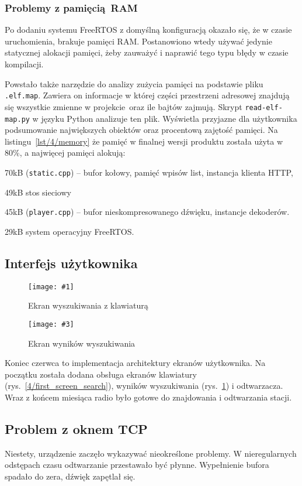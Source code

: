 \documentclass[polish]{aghengthesis}
\let\tempone\itemize
\let\temptwo\enditemize
\renewenvironment{itemize}{\tempone\setlength{\itemsep}{0cm}}{\temptwo}
\newcommand{\imgintss}[5]{
	\begin{figure}[{#5}]
		\centering
		\begin{minipage}{.45\textwidth}
			\centering
			\texttt{[image: \#1]}
			\caption{#2}
			\label{#1}
		\end{minipage}%
		\hfill
		\begin{minipage}{.45\textwidth}
			\centering
			\texttt{[image: \#3]}
			\caption{#4}
			\label{#3}
		\end{minipage}
	\end{figure}
}
\newcommand{\imghss}[4]{\imgintss{#1}{#2}{#3}{#4}{H}}
\newcommand{\lstfile}[3]{
	\noindent
	\hspace{0.1\linewidth}
	\begin{minipage}{0.8\linewidth}
		
	\end{minipage}
	\vspace{0.3cm}
}
\begin{document}
			\subsubsection{Problemy z pamięcią RAM}
				Po dodaniu systemu FreeRTOS z domyślną konfiguracją okazało się, że w czasie uruchomienia, brakuje pamięci RAM.
				Postanowiono wtedy używać jedynie statycznej alokacji pamięci, żeby zauważyć i naprawić tego typu błędy w czasie kompilacji.

				\lstfile{default}{Zajętość pamięci RAM}{lst/4/memory}

				Powstało także narzędzie do analizy zużycia pamięci na podstawie pliku \lstinline|.elf.map|. Zawiera on informacje w której części przestrzeni adresowej znajdują się wszystkie zmienne w projekcie oraz ile bajtów zajmują. Skrypt \lstinline|read-elf-map.py| w języku Python analizuje ten plik. Wyświetla przyjazne dla użytkownika podsumowanie największych obiektów oraz procentową zajętość pamięci. Na listingu~\ref{lst/4/memory} że pamięć w finalnej wersji produktu została użyta w 80\%, a najwięcej pamięci alokują:
				\begin{itemize}
					\item 70kB (\lstinline|static.cpp|) -- bufor kołowy, pamięć wpisów list, instancja klienta HTTP,
					\item 49kB stos sieciowy
					\item 45kB (\lstinline|player.cpp|) -- bufor nieskompresowanego dźwięku, instancje dekoderów.
					\item 29kB system operacyjny FreeRTOS.
				\end{itemize}
			
		\subsection{Interfejs użytkownika}
			\imghss{4/first_screen_search}{Ekran wyszukiwania z klawiaturą}{4/first_screen_res}{Ekran wyników wyszukiwania}
		
			Koniec czerwca to implementacja architektury ekranów użytkownika. Na początku została dodana obsługa ekranów klawiatury (rys.~\ref{4/first_screen_search}), wyników wyszukiwania (rys.~\ref{4/first_screen_res}) i odtwarzacza. Wraz z końcem miesiąca radio było gotowe do znajdowania i odtwarzania stacji.
			
		\subsection{Problem z oknem TCP}
			Niestety, urządzenie zaczęło wykazywać nieokreślone problemy. W nieregularnych odstępach czasu odtwarzanie przestawało być płynne. Wypełnienie bufora spadało do zera, dźwięk zapętlał się.
			
\end{document}

